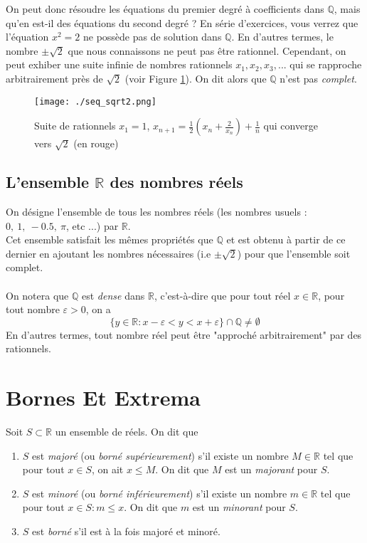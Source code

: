 \documentclass[oneside,11pt,french,table]{book}
\theoremstyle{definition}
\theoremstyle{plain}
\theoremstyle{remark}
\begin{document}
On peut donc résoudre les équations du premier degré à coefficients dans $\mathbb Q$, mais qu'en est-il des équations du second degré ? En série d'exercices, vous verrez que l'équation $x^2 = 2$ ne possède pas de solution dans $\mathbb Q$. En d'autres termes, le nombre $\pm \sqrt{2}$ que nous connaissons ne peut pas être rationnel. Cependant, on peut exhiber une suite infinie de nombres rationnels $x_1, x_2, x_3, ...$ qui se rapproche arbitrairement près de $\sqrt{2}$ (voir Figure \ref{fig:seq_sqrt2}). On dit alors que $\mathbb{Q}$ n'est pas \textit{complet}. \\

\begin{figure}[h]
\centering \texttt{[image: ./seq\_sqrt2.png]}
\caption{Suite de rationnels $x_1 = 1$, $x_{n+1} = \frac{1}{2} \left(x_n + \frac{2}{x_n} \right) + \frac{1}{n}$ qui converge vers $\sqrt{2}$ (en rouge)}
\label{fig:seq_sqrt2}
\end{figure}

\subsection{L'ensemble $\mathbb{R}$ des nombres réels}
On désigne l'ensemble de tous les nombres réels (les nombres usuels : $0, \ 1,\  -0.5,\ \pi$, etc ...) par $\mathbb{R}$. \\
Cet ensemble satisfait les mêmes propriétés que $\mathbb{Q}$ et est obtenu à partir de ce dernier en ajoutant les nombres nécessaires (i.e $\pm \sqrt{2}$) pour que l'ensemble soit complet. \\
\\
On notera que $\mathbb{Q}$ est \textit{dense} dans $\mathbb{R}$, c'est-à-dire que pour tout réel $x \in \mathbb R$, pour tout nombre $\varepsilon > 0$, on a $$\{y \in \mathbb R : x - \varepsilon < y < x + \varepsilon\} \cap \mathbb{Q} \neq \emptyset$$
En d'autres termes, tout nombre réel peut être "approché arbitrairement" par des rationnels. \\

\section{Bornes Et Extrema}

Soit $S \subset \mathbb R$ un ensemble de réels. On dit que

\begin{enumerate}
    \item $S$ est \textit{majoré} (ou \textit{borné supérieurement}) s'il existe un nombre $M \in \mathbb R$ tel que pour tout $x \in S$, on ait $x \leq M$. On dit que $M$ est un \textit{majorant} pour $S$.
    \item $S$ est \textit{minoré} (ou \textit{borné inférieurement}) s'il existe un nombre $m \in \mathbb R$ tel que pour tout $x \in S : m \leq x$. On dit que $m$ est un \textit{minorant} pour $S$.
    \item $S$ est \textit{borné} s'il est à la fois majoré et minoré.
\end{enumerate}
\end{document}
